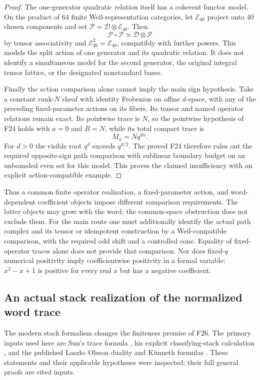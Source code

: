 \documentclass[11pt,a4paper]{article}
\renewcommand{\S}{\ensuremath{\mathsection}}
\newcommand{\fid}[1]{\textsf{#1}}\newcommand{\gate}[1]{\textsf{#1}}
\theoremstyle{named}\newtheorem{finding}{Finding}[section]
\theoremstyle{definition}\newtheorem{definition}[finding]{Definition}
\theoremstyle{remark}\newtheorem{remark}[finding]{Remark}
\begin{document}
\begin{proof}
The one-generator quadratic relation itself has a coherent
functor model. On the product of 64 finite Weil-representation
categories, let $\mathcal E_{40}$ project onto 40 chosen
components and set
$\mathcal P=\mathcal D\otimes\mathcal E_{40}$. Then
\[
 \mathcal P\circ\mathcal P
    \simeq\mathcal D\otimes\mathcal P
\]
by tensor associativity and
$\mathcal E_{40}^2=\mathcal E_{40}$, compatibly with further
powers. This models the split action of one generator and its
quadratic relation. It does not identify a simultaneous model
for the second generator, the original integral tensor lattice,
or the designated nonstandard bases.

Finally the action comparison alone cannot imply the main
sign hypothesis. Take a constant rank-$N$ sheaf with identity
Frobenius on affine $d$-space, with any of the preceding
fixed-parameter actions on its fibers. Its tensor and named
operator relations remain exact. Its pointwise trace is $N$,
so the pointwise hypothesis of \fid{F24} holds with $a=0$
and $B=N$, while its total compact trace is
\[
 M_n=Nq^{dn}.
\]
For $d>0$ the visible root $q^d$ exceeds $q^{d/2}$.
The proved \fid{F24} therefore rules out the required
opposite-sign path comparison with sublinear boundary budget
on an unbounded even set for this model. This proves the
claimed insufficiency with an explicit action-compatible
example.
\end{proof}

Thus a common finite operator realization, a fixed-parameter
action, and word-dependent coefficient objects impose different
comparison requirements. The latter objects may grow with the
word; the common-space obstruction does not exclude them.
For the main route one must additionally identify the actual
path complex and its tensor or idempotent construction by a
Weil-compatible comparison, with the required odd shift and a
controlled cone. Equality of fixed-operator traces alone does
not provide that comparison. Nor does fixed-$q$ numerical
positivity imply coefficientwise positivity in a formal
variable: $x^2-x+1$ is positive for every real $x$ but has a
negative coefficient.


\subsection{An actual stack realization of the normalized word trace}
The modern stack formalism changes the finiteness premise of
\fid{F26}. The primary inputs used here are Sun's trace formula
\cite[Theorem~1.1, p.~49; Definition~4.1, p.~84; Theorem~4.2,
p.~85]{SunStacks}, his explicit classifying-stack calculation
\cite[Theorem~4.8 and \S4.8.2, pp.~89--90; Example~7.4,
p.~109]{SunStacks}, and the published Laszlo--Olsson duality and
K\"unneth formulas \cite[\S9.1, Lemmas~9.1.1--9.1.2, p.~198;
Theorem~11.0.14, p.~204]{LO2}. These statements and their applicable
hypotheses were inspected; their full general proofs are cited inputs.
\end{document}
